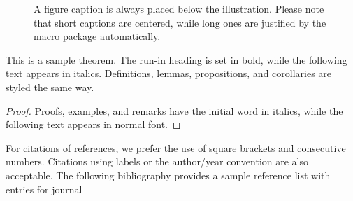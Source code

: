 \documentclass[runningheads]{llncs}
\begin{document}
    \begin{figure}
        \caption{A figure caption is always placed below the illustration.
        Please note that short captions are centered, while long ones are
        justified by the macro package automatically.} \label{fig1}
    \end{figure}

    \begin{theorem}
        This is a sample theorem. The run-in heading is set in bold, while
        the following text appears in italics. Definitions, lemmas,
        propositions, and corollaries are styled the same way.
    \end{theorem}
%
%
    \begin{proof}
        Proofs, examples, and remarks have the initial word in italics,
        while the following text appears in normal font.
    \end{proof}
    For citations of references, we prefer the use of square brackets
    and consecutive numbers. Citations using labels or the author/year
    convention are also acceptable. The following bibliography provides
    a sample reference list with entries for journal
%
%
%
    
    
%
\end{document}
